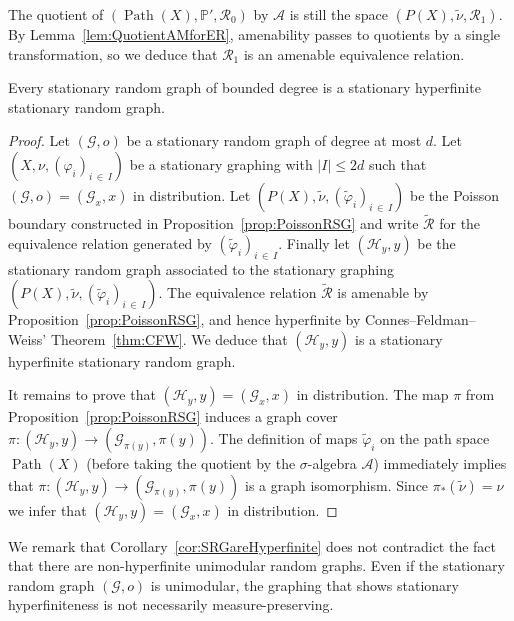 \documentclass[10pt]{amsart}
\theoremstyle{definition}\newtheorem{defi}[theo]{Definition}\newtheorem{rema}[theo]{Remark}\newtheorem{exam}[theo]{Example}\newtheorem{exem}[theo]{Example}\newtheorem{nota}[theo]{Notation}
\DeclareMathOperator{\Path}{Path}
\newcommand{\bbP}{\mathbb{P}}
\newcommand{\calR}{\mathcal{R}}
\newcommand{\calA}{\mathcal{A}}
\newcommand{\calH}{\mathcal{H}}
\newcommand{\calG}{\mathcal{G}}
\begin{document}
The quotient of $(\Path(X),\bbP',\calR_0)$ by $\calA$ is still the space $(P(X),\widetilde{\nu},\calR_1)$. By Lemma~\ref{lem:QuotientAMforER}, amenability passes to quotients by a single transformation, so we deduce that $\calR_1$ is an amenable equivalence relation.

\begin{coro}\label{cor:SRGareHyperfinite}
Every stationary random graph of bounded degree is a stationary hyperfinite stationary random graph.
\end{coro}

\begin{proof}
Let $(\calG,o)$ be a stationary random graph of degree at most $d$. Let $(X,\nu,(\varphi_i)_{i\,\in\,I})$ be a stationary graphing with $|I|\leq 2d$ such that $(\calG,o)=(\calG_x,x)$ in distribution. Let $(P(X),\widetilde{\nu},(\widetilde\varphi_i)_{i\,\in\,I})$ be the Poisson boundary constructed in Proposition~\ref{prop:PoissonRSG} and write $\widetilde{\calR}$ for the equivalence relation generated by $(\widetilde\varphi_i)_{i\,\in\,I}$. Finally let $(\calH_y,y)$ be the stationary random graph associated to the stationary graphing $(P(X),\widetilde{\nu},(\widetilde{\varphi}_i)_{i\,\in\,I})$. The equivalence relation $\widetilde{\calR}$ is amenable by Proposition~\ref{prop:PoissonRSG}, and hence hyperfinite by Connes--Feldman--Weiss' Theorem~\ref{thm:CFW}. We deduce that $(\calH_y,y)$ is a stationary hyperfinite stationary random graph.

It remains to prove that $(\calH_y,y)=(\calG_x,x)$ in distribution. The map $\pi$ from Proposition~\ref{prop:PoissonRSG} induces a graph cover $\pi\colon (\calH_y, y)\to (\calG_{\pi(y)},\pi(y)).$ The definition of maps $\widetilde\varphi_i$ on the path space $\Path(X)$ (before taking the quotient by the $\sigma$-algebra $\calA$) immediately implies that $\pi\colon (\calH_y, y)\to (\calG_{\pi(y)},\pi(y))$ is a graph isomorphism. Since $\pi_*(\widetilde{\nu})=\nu$ we infer that $(\calH_y,y)=(\calG_x,x)$ in distribution.
\end{proof}

We remark that Corollary~\ref{cor:SRGareHyperfinite} does not contradict the fact that there are non-hyperfinite unimodular random graphs. Even if the stationary random graph $(\calG,o)$ is unimodular, the graphing that shows stationary hyperfiniteness is not necessarily measure-preserving.

\vspace*{20pt}

\break
\end{document}
